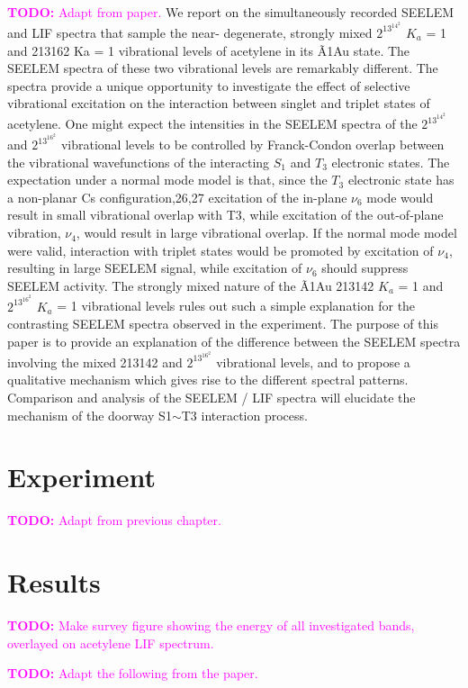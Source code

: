 \documentclass[12pt,draft]{mitthesis}
\newcommand{\TODO} [1]{\textcolor{magenta}{\textbf{TODO:} #1}}
\begin{document}
\TODO{Adapt from paper.}  We report on the simultaneously recorded
SEELEM and LIF spectra that sample the near- degenerate, strongly
mixed $2^13^14^2$ $K_a$ = 1 and 213162 Ka = 1 vibrational levels of
acetylene in its Ã1Au state. The SEELEM spectra of these two
vibrational levels are remarkably different. The spectra provide a
unique opportunity to investigate the effect of selective vibrational
excitation on the interaction between singlet and triplet states of
acetylene. One might expect the intensities in the SEELEM spectra of
the $2^13^14^2$ and $2^13^16^2$ vibrational levels to be controlled by
Franck-Condon overlap between the vibrational wavefunctions of the
interacting $S_1$ and $T_3$ electronic states. The expectation under a
normal mode model is that, since the $T_3$ electronic state has a
non-planar Cs configuration,26,27 excitation of the in-plane $\nu_6$ mode
would result in small vibrational overlap with T3, while excitation of
the out-of-plane vibration, $\nu_4$, would result in large vibrational
overlap. If the normal mode model were valid, interaction with triplet
states would be promoted by excitation of $\nu_4$, resulting in large
SEELEM signal, while excitation of $\nu_6$ should suppress SEELEM
activity. The strongly mixed nature of the Ã1Au 213142 $K_a$ = 1 and
$2^13^16^2$ $K_a$ = 1 vibrational levels rules out such a simple
explanation for the contrasting SEELEM spectra observed in the
experiment. The purpose of this paper is to provide an explanation of
the difference between the SEELEM spectra involving the mixed 213142
and $2^13^16^2$ vibrational levels, and to propose a qualitative
mechanism which gives rise to the different spectral
patterns. Comparison and analysis of the SEELEM / LIF spectra will
elucidate the mechanism of the doorway S1$\sim$T3 interaction process.

\section{Experiment}

\TODO{Adapt from previous chapter.}

\section{Results}

\TODO{Make survey figure showing the energy of all investigated bands,
  overlayed on acetylene LIF spectrum.}


\TODO{Adapt the following from the paper.}
\end{document}
